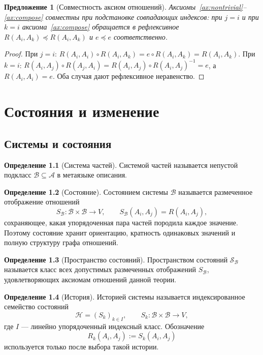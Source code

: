 \documentclass[12pt,a4paper,oneside]{book}
\theoremstyle{definition}
\newtheorem{definition}{Определение}[chapter]
\theoremstyle{plain}
\newtheorem{proposition}{Предложение}[chapter]
\theoremstyle{remark}
\newcommand{\Parts}{\mathcal A}
\newcommand{\SubParts}{\mathcal B}
\newcommand{\Rel}{R}
\newcommand{\Values}{V}
\newcommand{\State}{S}
\newcommand{\States}{\mathcal S}
\newcommand{\comp}{\circ}
\newcommand{\Vord}{\preceq}
\newcommand{\ide}{e}
\begin{document}
\begin{proposition}[Совместность аксиом отношений]
Аксиомы~\ref{ax:nontrivial}--\ref{ax:compose} совместны при подстановке совпадающих
индексов: при $j=i$ и при $k=i$ аксиома~\ref{ax:compose} обращается в рефлексивное
$\Rel(A_i,A_k)\Vord\Rel(A_i,A_k)$ и $\ide\Vord\ide$ соответственно.
\end{proposition}

\begin{proof}
При $j=i$: $\Rel(A_i,A_i)\comp\Rel(A_i,A_k)=\ide\comp\Rel(A_i,A_k)=\Rel(A_i,A_k)$.
При $k=i$: $\Rel(A_i,A_j)\comp\Rel(A_j,A_i)=\Rel(A_i,A_j)\comp\Rel(A_i,A_j)^{-1}=\ide$,
а $\Rel(A_i,A_i)=\ide$. Оба случая дают рефлексивное неравенство.
\end{proof}

\chapter{Состояния и изменение}

\section{Системы и состояния}

\begin{definition}[Система частей]
Системой частей называется непустой подкласс $\SubParts\subseteq\Parts$ в метаязыке
описания.
\end{definition}

\begin{definition}[Состояние]
Состоянием системы $\SubParts$ называется размеченное отображение отношений
\[
\State_{\SubParts}:\SubParts\times\SubParts\to\Values,
\qquad
\State_{\SubParts}(A_i,A_j)=\Rel(A_i,A_j),
\]
сохраняющее, какая упорядоченная пара частей породила каждое значение. Поэтому
состояние хранит ориентацию, кратность одинаковых значений и полную структуру графа
отношений.
\end{definition}

\begin{definition}[Пространство состояний]
Пространством состояний $\States_{\SubParts}$ называется класс всех допустимых
размеченных отображений $\State_{\SubParts}$, удовлетворяющих аксиомам отношений
данной теории.
\end{definition}

\begin{definition}[История]
Историей системы называется индексированное семейство состояний
\[
\mathcal H=(\State_k)_{k\in I},\qquad
\State_k:\SubParts\times\SubParts\to\Values,
\]
где $I$ --- линейно упорядоченный индексный класс. Обозначение
\[
\Rel_k(A_i,A_j):=\State_k(A_i,A_j)
\]
используется только после выбора такой истории.
\end{definition}
\end{document}
